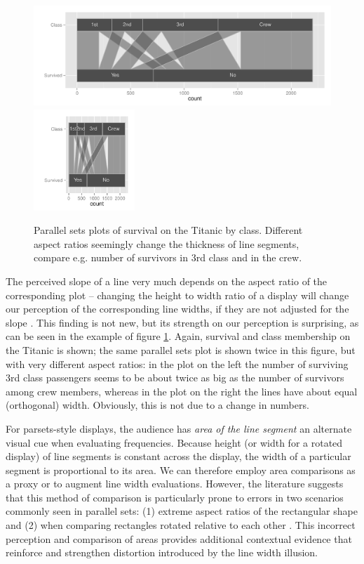 \begin{figure}[htbp]
\begin{center}
\includegraphics[height=1.5in]{images/aspect31-titanic.pdf}
\includegraphics[height=1.5in]{images/aspect33-titanic.pdf}
\end{center}
\caption{\label{fig:aspect}Parallel sets plots of survival on the Titanic by class. Different aspect ratios  seemingly change the thickness of line segments, compare e.g. number of survivors in 3rd class and in the crew. }
\end{figure}



The perceived slope of a line very much depends on the aspect ratio of the corresponding plot -- changing the height to width ratio of a display  will change our perception of the corresponding line widths, if they are not adjusted for the slope \cite{cleveland:1984}. This finding is not new, but its strength on our perception is surprising, as can be seen in the example of  figure \ref{fig:aspect}.  Again, survival and class membership on the Titanic is shown; the same parallel sets plot is shown twice in this figure, but with very different aspect ratios: in the  plot on the left the number of surviving 3rd class passengers seems to be about twice as big as the number of survivors among crew members, whereas in the plot on the right the lines have about equal (orthogonal) width. Obviously, this is not due to a change in numbers.

For parsets-style displays, the audience has {\it area of the line segment} an alternate visual cue when evaluating frequencies. Because height (or width for a rotated display) of  line segments is constant across the display, the width of a particular  segment is proportional to its area. We can therefore employ area comparisons as a proxy or to augment line width evaluations. 
However, the literature suggests that this method of comparison is particularly  prone to errors in two scenarios commonly seen in parallel sets: (1) extreme aspect ratios of the rectangular shape \citep{heer:2010} %
and (2) when comparing rectangles rotated relative to each other \citep{kong:2010}. 
This incorrect perception and comparison of areas provides additional contextual evidence that reinforce and strengthen distortion introduced by the line width illusion.


